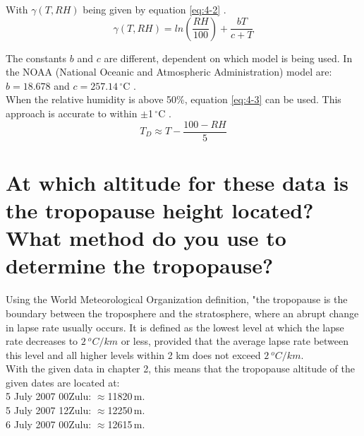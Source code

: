 \documentclass{article}
\begin{document}
With $\gamma (T, RH)$ being given by equation \ref{eq:4-2} \cite{wikiQ4}.
\begin{equation}
\gamma (T, RH) = ln \left( \frac{RH}{100} \right) + \frac{bT}{c + T} \label{eq:4-2}
\end{equation}

The constants $b$ and $c$ are different, dependent on which model is being used. In the NOAA (National Oceanic and Atmospheric Administration) model are: $b = 18.678$ and $c = 257.14$\,$^\circ$C \cite{wikiQ4}.\\

When the relative humidity is above 50\%, equation \ref{eq:4-3} can be used. This approach is accurate to within $\pm$1\,$^\circ$C \cite{wikiQ4}.
\begin{equation}
T_D \approx T - \frac{100 - RH}{5} \label{eq:4-3}
\end{equation}



\newpage
\section{At which altitude for these data is the tropopause height located?What method do you use to determine the tropopause?}
Using the World Meteorological Organization definition, "the tropopause is the boundary between the troposphere and the stratosphere, where an abrupt change in lapse rate usually occurs. It is defined as the lowest level at which the lapse rate decreases to $2 \ ^{o}C/km$ or less, provided that the average lapse rate between this level and all higher levels within 2 km does not exceed $2 \  ^{o}C/km$.\\

With the given data in chapter 2, this means that the tropopause altitude of the given dates are located at:\\
5 July 2007 00Zulu: $\approx$11820\,m.\\
5 July 2007 12Zulu: $\approx$12250\,m.\\
6 July 2007 00Zulu: $\approx$12615\,m.\\

\newpage
\end{document}
